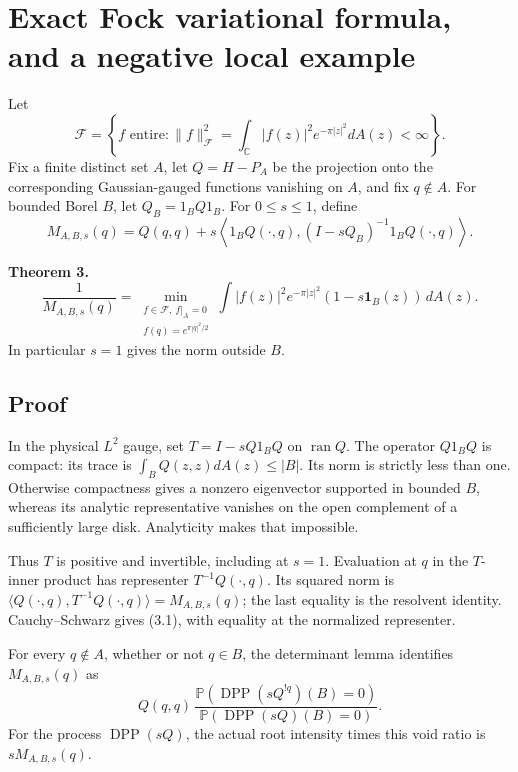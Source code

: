 \documentclass[11pt,a4paper]{article}
\theoremstyle{definition}
\theoremstyle{remark}
\numberwithin{equation}{section}
\begin{document}
\hypertarget{exact-fock-variational-formula-and-a-negative-local-example}{%
\section{Exact Fock variational formula, and a negative local example}\label{exact-fock-variational-formula-and-a-negative-local-example}}

Let \[
\mathcal F=\left\{f\text{ entire}:
\|f\|_{\mathcal F}^2=\int_{\mathbb C}|f(z)|^2e^{-\pi|z|^2}dA(z)
<\infty\right\}.
\] Fix a finite distinct set \(A\), let \(Q=H-P_A\) be the projection onto the corresponding Gaussian-gauged functions vanishing on \(A\), and fix \(q\notin A\). For bounded Borel \(B\), let \(Q_B=1_BQ1_B\). For \(0\le s\le1\), define \[
M_{A,B,s}(q)=Q(q,q)+s\left\langle
 1_BQ(\cdot,q),(I-sQ_B)^{-1}1_BQ(\cdot,q)
\right\rangle.
\]

\textbf{Theorem 3.} \[
\boxed{\quad
\frac1{M_{A,B,s}(q)}
=\min_{\substack{f\in\mathcal F,\ f|_A=0\\
                   f(q)=e^{\pi|q|^2/2}}}
\int |f(z)|^2e^{-\pi|z|^2}
                 (1-s\mathbf1_B(z))\,dA(z).
\quad}
\tag{3.1}
\] In particular \(s=1\) gives the norm outside \(B\).

\hypertarget{proof-1}{%
\subsection{Proof}\label{proof-1}}

In the physical \(L^2\) gauge, set \(T=I-sQ1_BQ\) on \(\operatorname{ran}Q\). The operator \(Q1_BQ\) is compact: its trace is \(\int_B Q(z,z)dA(z)\le|B|\). Its norm is strictly less than one. Otherwise compactness gives a nonzero eigenvector supported in bounded \(B\), whereas its analytic representative vanishes on the open complement of a sufficiently large disk. Analyticity makes that impossible.

Thus \(T\) is positive and invertible, including at \(s=1\). Evaluation at \(q\) in the \(T\)-inner product has representer \(T^{-1}Q(\cdot,q)\). Its squared norm is \(\langle Q(\cdot,q),T^{-1}Q(\cdot,q)\rangle=M_{A,B,s}(q)\); the last equality is the resolvent identity. Cauchy--Schwarz gives (3.1), with equality at the normalized representer.

For every \(q\notin A\), whether or not \(q\in B\), the determinant lemma identifies \(M_{A,B,s}(q)\) as \[
Q(q,q)\,
\frac{\mathbb P(\operatorname{DPP}(sQ^{!q})(B)=0)}
     {\mathbb P(\operatorname{DPP}(sQ)(B)=0)}.
\tag{3.2}
\] For the process \(\operatorname{DPP}(sQ)\), the actual root intensity times this void ratio is \(sM_{A,B,s}(q)\).
\end{document}
